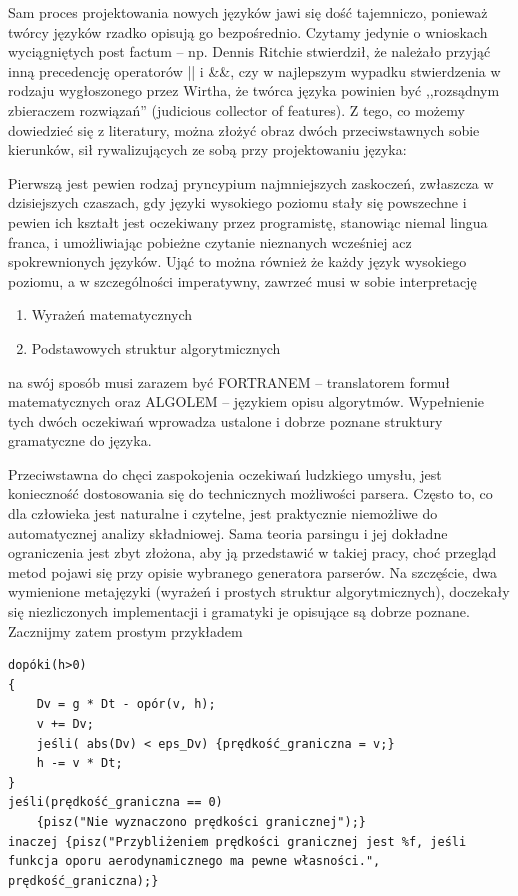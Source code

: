 Sam proces projektowania nowych języków jawi się dość tajemniczo, ponieważ twórcy języków rzadko opisują go bezpośrednio. Czytamy jedynie o wnioskach wyciągniętych post factum – np. Dennis Ritchie stwierdził, że należało przyjąć inną precedencję operatorów || i \&\&\cite{Ritchie_mail}, czy w najlepszym wypadku stwierdzenia w rodzaju wygłoszonego przez Wirtha, że twórca języka powinien być ,,rozsądnym zbieraczem rozwiązań'' (judicious collector of features)\cite{Wirth_recollections_Pascal}. Z tego, co możemy dowiedzieć się z literatury, można złożyć obraz dwóch przeciwstawnych sobie kierunków, sił rywalizujących ze sobą przy projektowaniu języka:

Pierwszą jest pewien rodzaj pryncypium najmniejszych zaskoczeń, zwłaszcza w dzisiejszych czaszach, gdy języki wysokiego poziomu stały się powszechne i pewien ich kształt jest oczekiwany przez programistę, stanowiąc niemal lingua franca, i umożliwiając pobieżne czytanie nieznanych wcześniej acz spokrewnionych języków. Ująć to można również  że każdy język wysokiego poziomu, a w szczególności imperatywny, zawrzeć musi w sobie interpretację
\begin{enumerate}[noitemsep, label=(\alph*)]
    \item Wyrażeń matematycznych
    \item Podstawowych struktur algorytmicznych
\end{enumerate}
na swój sposób musi zarazem być FORTRANEM – translatorem formuł matematycznych oraz ALGOLEM – językiem opisu algorytmów.
Wypełnienie tych dwóch oczekiwań wprowadza ustalone i dobrze poznane struktury gramatyczne do języka.

Przeciwstawna do chęci zaspokojenia oczekiwań ludzkiego umysłu, jest konieczność dostosowania się do technicznych możliwości parsera. Często to, co dla człowieka jest naturalne i czytelne, jest praktycznie niemożliwe do automatycznej analizy składniowej.  Sama teoria parsingu i jej dokładne ograniczenia jest zbyt złożona, aby ją przedstawić w takiej pracy, choć przegląd metod pojawi się przy opisie wybranego generatora parserów. Na szczęście, dwa wymienione metajęzyki (wyrażeń i prostych struktur algorytmicznych), doczekały się niezliczonych implementacji i gramatyki je opisujące są dobrze poznane. Zacznijmy zatem prostym przykładem

\begin{lstlisting}
dopóki(h>0)
{
    Dv = g * Dt - opór(v, h);
    v += Dv;
    jeśli( abs(Dv) < eps_Dv) {prędkość_graniczna = v;}
    h -= v * Dt;
}
jeśli(prędkość_graniczna == 0)
    {pisz("Nie wyznaczono prędkości granicznej");}
inaczej {pisz("Przybliżeniem prędkości granicznej jest %f, jeśli funkcja oporu aerodynamicznego ma pewne własności.", prędkość_graniczna);}
\end{lstlisting}



